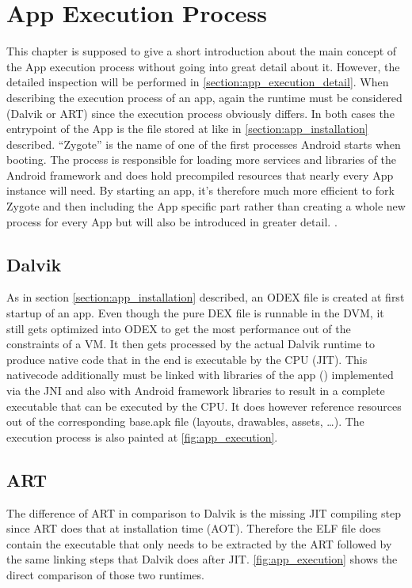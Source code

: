 \section{App Execution Process}\label{section:app_execution_simple}
This chapter is supposed to give a short introduction about the
main concept of the App execution process without going into
great detail about it. However, the detailed inspection will
be performed in \autoref{section:app_execution_detail}.
When describing the execution process of an app, again the
runtime must be considered (Dalvik or ART) since the execution process
obviously differs. In both cases the entrypoint of the App is the
file stored at  like in
\autoref{section:app_installation} described. ``Zygote'' is
the name of one of the first processes Android starts when booting.
The process is responsible for loading more services and libraries
of the Android framework and does hold precompiled resources that
nearly every App instance will need.
By starting an app, it's therefore much more efficient to fork
Zygote and then including the App specific part rather than
creating a whole new process for every App but will also be introduced
in greater detail.
\parencite[ch.2]{hackershandbook}.

\subsection{Dalvik}
As in section \autoref{section:app_installation} described, an
ODEX file is created at first startup of an app. Even though
the pure DEX file is runnable in the DVM, it still gets optimized
into ODEX to get the most performance out of the
constraints of a VM.
It then gets processed by the actual Dalvik runtime to produce
native code that in the end is executable by the CPU (JIT).
This nativecode additionally must be linked with libraries of the app
() implemented via the JNI
and also with Android framework libraries to result in a complete
executable that can be executed by the CPU. It does however
reference resources out of the corresponding base.apk file (layouts,
drawables, assets, \ldots). The execution process is also painted
at \autoref{fig:app_execution}.

\subsection{ART}
The difference of ART in comparison to Dalvik is the missing
JIT compiling step since ART does that at installation time
(AOT). Therefore the ELF file does contain the executable that
only needs to be extracted by the ART followed by the same
linking steps that Dalvik does after JIT. \autoref{fig:app_execution}
shows the direct comparison of those two runtimes.


